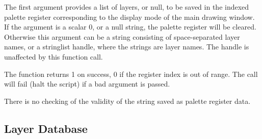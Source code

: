 \begin{description}
The first argument provides a list of layers, or null, to be saved
in the indexed palette register corresponding to the display mode
of the main drawing window.  If the argument is a scalar 0, or a
null string, the palette register will be cleared.  Otherwise this
argument can be a string consisting of space-separated layer
names, or a stringlist handle, where the strings are layer names.
The handle is unaffected by this function call.

The function returns 1 on success, 0 if the register index is out
of range.  The call will fail (halt the script) if a bad argument
is passed.

There is no checking of the validity of the string saved as palette
register data.
\end{description}


\subsection{Layer Database}

